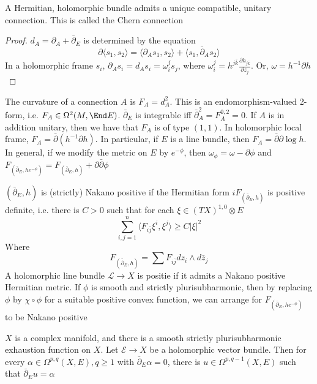 \documentclass[../main.tex]{subfiles}
\begin{document}
\begin{proposition}
A Hermitian, holomorphic bundle admits a unique compatible, unitary connection. This is called the Chern connection
\end{proposition}

\begin{proof}
$d_A=\partial_A+\bar\partial_E$ is determined by the equation
\[\partial\langle s_1,s_2\rangle=\langle \partial_A s_1,s_2\rangle+\langle s_1,\bar\partial_A s_2\rangle\]
In a holomorphic frame $s_i$, $\partial_A s_i=d_As_i=\omega_i^js_j$, where $\omega^j_i=h^{j\bar k}\frac{\partial h_{j\bar k}}{\partial z_j}$. Or, $\omega=h^{-1}\partial h$
\end{proof}

\begin{definition}
The curvature of a connection $A$ is $F_A=d^2_A$. This is an endomorphism-valued 2-form, i.e. $F_A\in\Omega^2(M,\End E)$. $\bar\partial_E$ is integrable iff $\bar\partial^2_A=F^{0,2}_A=0$. If $A$ is in addition unitary, then we have that $F_A$ is of type $(1,1)$. In holomorphic local frame, $F_A=\bar\partial(h^{-1}\partial h)$. In particular, if $E$ is a line bundle, then $F_A=\bar\partial\partial\log h$. In general, if we modify the metric on $E$ by $e^{-\phi}$, then $\omega_\phi=\omega-\partial\phi$ and $F_{(\bar\partial_E,he^{-\phi})}=F_{(\bar\partial_E,h)}+\partial\bar\partial\phi$
\end{definition}

\begin{definition}
$(\bar\partial_E,h)$ is (strictly) Nakano positive if the Hermitian form $iF_{(\bar\partial_E,h)}$ is positive definite, i.e. there is $C>0$ such that for each $\xi\in(TX)^{1,0}\otimes E$
\[\sum_{i,j=1}^n\langle F_{i\bar j}\xi^i,\xi^j\rangle\geq C|\xi|^2\]
Where
\[F_{(\bar\partial_E,h)}=\sum F_{i\bar j}dz_i\wedge d\bar z_j\]
A holomorphic line bundle $\mathcal L\to X$ is positie if it admits a Nakano positive Hermitian metric. If $\phi$ is smooth and strictly plurisubharmonic, then by replacing $\phi$ by $\chi\circ\phi$ for a suitable positive convex function, we can arrange for $F_{(\bar\partial_E,he^{-\phi})}$ to be Nakano positive
\end{definition}

\begin{theorem}
$X$ is a complex manifold, and there is a smooth strictly plurisubharmonic exhaustion function on $X$. Let $\mathcal E\to X$ be a holomorphic vector bundle. Then for every $\alpha\in\Omega^{p,q}(X,E),q\geq1$ with $\bar\partial_E\alpha=0$, there is $u\in\Omega^{p,q-1}(X,E)$ such that $\bar\partial_Eu=\alpha$
\end{theorem}
\end{document}
